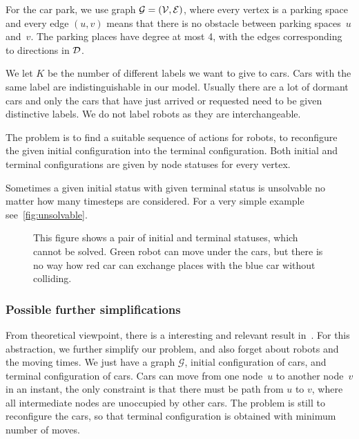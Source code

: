 For the car park, we use graph $\label{eq:graph}\mathcal{G} = (\mathcal{V},\mathcal{E})$, where every vertex is a
parking space and every edge $(u,v)$ means that there is no obstacle between
parking spaces~$u$ and~$v$. The parking places have degree at most 4,
with the edges corresponding to directions in $\mathcal{D}$.

We let $K$ be the number of different labels we want to give to cars. Cars with
the same label are indistinguishable in our model. Usually there are a lot of
dormant cars and only the cars that have just arrived or requested need to be
given distinctive labels. We do not label robots as they are interchangeable.

The problem is to find a suitable sequence of actions for robots, to
reconfigure the given initial configuration into the terminal configuration.
Both initial and terminal configurations are given by node statuses for every
vertex.

Sometimes a given initial status with given terminal status is unsolvable no
matter how many timesteps are considered. For a very simple example
see~\autoref{fig:unsolvable}.

\begin{figure}[h]
    \begin{center}
        
        \caption{This figure shows a pair of initial and terminal statuses,
            which cannot be solved. Green robot can move under the cars, but there
            is no way how red car can exchange places with the blue car without
        colliding.}
        \label{fig:unsolvable}
    \end{center}
\end{figure}

\subsubsection{Possible further simplifications}
From theoretical viewpoint, there is a interesting and relevant result
in~\cite{calinescu2008reconfigurations}. For this abstraction, we further
simplify our problem, and also forget about robots and the moving times. We
just have a graph $\mathcal{G}$, initial configuration of cars, and terminal
configuration of cars. Cars can move from one node~$u$ to another node~$v$ in
an instant, the only constraint is that there must be path from $u$ to $v$,
where all intermediate nodes are unoccupied by other cars. The problem is still
to reconfigure the cars, so that terminal configuration is obtained with
minimum number of moves. 


